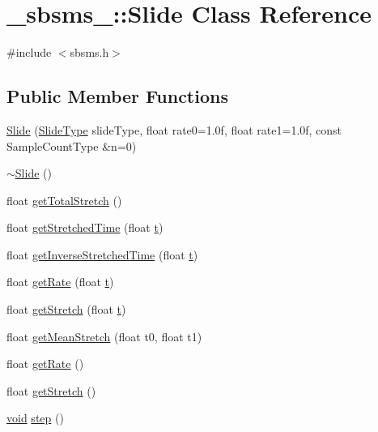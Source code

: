 \hypertarget{class__sbsms___1_1_slide}{}\section{\+\_\+sbsms\+\_\+\+:\+:Slide Class Reference}
\label{class__sbsms___1_1_slide}


{\ttfamily \#include $<$sbsms.\+h$>$}

\subsection*{Public Member Functions}
\begin{DoxyCompactItemize}
\item 
\hyperlink{class__sbsms___1_1_slide_ad713ad2658fbcf9891f7f5b0231962be}{Slide} (\hyperlink{namespace__sbsms___a208fc16133e115cda214f563a3a19a49}{Slide\+Type} slide\+Type, float rate0=1.\+0f, float rate1=1.\+0f, const Sample\+Count\+Type \&n=0)
\item 
\hyperlink{class__sbsms___1_1_slide_a8d5a655b75b8554a2e7802c279426d2f}{$\sim$\+Slide} ()
\item 
float \hyperlink{class__sbsms___1_1_slide_a26a670c0e5b55bf979078af56e8f81fb}{get\+Total\+Stretch} ()
\item 
float \hyperlink{class__sbsms___1_1_slide_a56f64221cef00a71b08679e6babe4be9}{get\+Stretched\+Time} (float \hyperlink{octave__test_8m_aaccc9105df5383111407fd5b41255e23}{t})
\item 
float \hyperlink{class__sbsms___1_1_slide_abc5140d83f66db7fe0a55bbda33cfede}{get\+Inverse\+Stretched\+Time} (float \hyperlink{octave__test_8m_aaccc9105df5383111407fd5b41255e23}{t})
\item 
float \hyperlink{class__sbsms___1_1_slide_ac269437e48f263fe1e9786cc7b61d270}{get\+Rate} (float \hyperlink{octave__test_8m_aaccc9105df5383111407fd5b41255e23}{t})
\item 
float \hyperlink{class__sbsms___1_1_slide_ad3db2dfc0da59be65bb9679077f9b1a7}{get\+Stretch} (float \hyperlink{octave__test_8m_aaccc9105df5383111407fd5b41255e23}{t})
\item 
float \hyperlink{class__sbsms___1_1_slide_aefbe5dfc048b9b08a7283b31707cfeca}{get\+Mean\+Stretch} (float t0, float t1)
\item 
float \hyperlink{class__sbsms___1_1_slide_acba3fd3605dbe7ebcfa2edfa58657e77}{get\+Rate} ()
\item 
float \hyperlink{class__sbsms___1_1_slide_a853afe76c1fa87b6c9eafc023cb16972}{get\+Stretch} ()
\item 
\hyperlink{sound_8c_ae35f5844602719cf66324f4de2a658b3}{void} \hyperlink{class__sbsms___1_1_slide_a40349a69ba9bae218d3d7c5f7dc66222}{step} ()
\end{DoxyCompactItemize}
